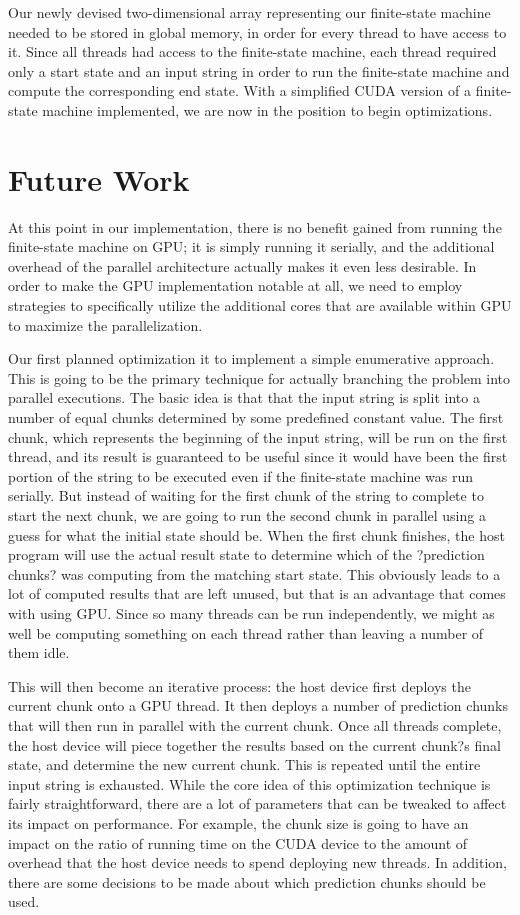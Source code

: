 \documentclass[11pt]{sigplanconf}
\begin{document}
Our newly devised two-dimensional array representing our finite-state machine needed to be stored in global memory, in order for every thread to have access to it. Since all threads had access to the finite-state machine, each thread required only a start state and an input string in order to run the finite-state machine and compute the corresponding end state. With a simplified CUDA version of a finite-state machine implemented, we are now in the position to begin optimizations.

\section{Future Work}

At this point in our implementation, there is no benefit gained from running the finite-state machine on GPU; it is simply running it serially, and the additional overhead of the parallel architecture actually makes it even less desirable. In order to make the GPU implementation notable at all, we need to employ strategies to specifically utilize the additional cores that are available within GPU to maximize the parallelization. 

Our first planned optimization it to implement a simple enumerative approach. This is going to be the primary technique for actually branching the problem into parallel executions. The basic idea is that that the input string is split into a number of equal chunks determined by some predefined constant value. The first chunk, which represents the beginning of the input string, will be run on the first thread, and its result is guaranteed to be useful since it would have been the first portion of the string to be executed even if the finite-state machine was run serially. But instead of waiting for the first chunk of the string to complete to start the next chunk, we are going to run the second chunk in parallel using a guess for what the initial state should be. When the first chunk finishes, the host program will use the actual result state to determine which of the ?prediction chunks? was computing from the matching start state. This obviously leads to a lot of computed results that are left unused, but that is an advantage that comes with using GPU. Since so many threads can be run independently, we might as well be computing something on each thread rather than leaving a number of them idle. 

This will then become an iterative process: the host device first deploys the current chunk onto a GPU thread. It then deploys a number of prediction chunks that will then run in parallel with the current chunk. Once all threads complete, the host device will piece together the results based on the current chunk?s final state, and determine the new current chunk. This is repeated until the entire input string is exhausted. While the core idea of this optimization technique is fairly straightforward, there are a lot of parameters that can be tweaked to affect its impact on performance. For example, the chunk size is going to have an impact on the ratio of running time on the CUDA device to the amount of overhead that the host device needs to spend deploying new threads. In addition, there are some decisions to be made about which prediction chunks should be used. 
\end{document}
